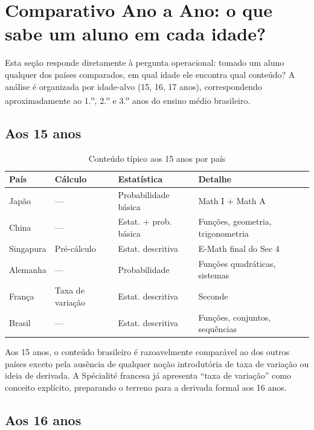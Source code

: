 \documentclass[12pt,a4paper,oneside]{article}
\begin{document}
\section{Comparativo Ano a Ano: o que sabe um aluno em cada idade?}

Esta seção responde diretamente à pergunta operacional: tomado um
aluno qualquer dos países comparados, em qual idade ele encontra
qual conteúdo? A análise é organizada por idade-alvo (15, 16, 17
anos), correspondendo aproximadamente ao 1.\textsuperscript{o},
2.\textsuperscript{o} e 3.\textsuperscript{o} anos do ensino médio
brasileiro.

\subsection{Aos 15 anos}

\begin{table}[H]
\centering
\caption{Conteúdo típico aos 15 anos por país}
\label{tab:idade-15}
\small
\begin{tabular}{@{}lp{2.2cm}p{2.5cm}p{6cm}@{}}
\toprule
\textbf{País} & \textbf{Cálculo} & \textbf{Estatística} & \textbf{Detalhe} \\
\midrule
Japão          & ---  & Probabilidade básica   & Math I + Math A \\
China          & ---  & Estat. + prob. básica  & Funções, geometria, trigonometria \\
Singapura      & Pré-cálculo & Estat. descritiva & E-Math final do Sec 4 \\
Alemanha       & ---  & Probabilidade          & Funções quadráticas, sistemas \\
França         & Taxa de variação & Estat. descritiva & Seconde \\
Brasil         & ---  & Estat. descritiva      & Funções, conjuntos, sequências \\
\bottomrule
\end{tabular}
\end{table}

Aos 15 anos, o conteúdo brasileiro é razoavelmente comparável ao
dos outros países \textemdash{} exceto pela ausência de qualquer
noção introdutória de taxa de variação ou ideia de derivada. A
Spécialité francesa já apresenta ``taxa de variação'' como conceito
explícito, preparando o terreno para a derivada formal aos
16 anos.

\subsection{Aos 16 anos}
\end{document}
